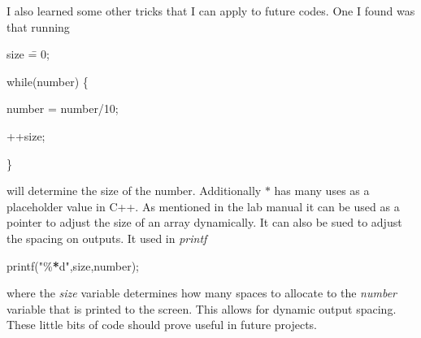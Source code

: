 \documentclass{article}
\begin{document}
I also learned some other tricks that I can apply to future codes. One I found was that running
\newline

size \= = 0;

while(number) \{

\tab number = number/10;

\tab ++size;

\}
\newline

will determine the size of the number. Additionally $\ast$ has many uses as a placeholder value in C++. As mentioned in the lab manual it can be used as a pointer to adjust the size of an array dynamically. It can also be sued to adjust the spacing on outputs. It used in \textit{printf}
\newline

printf("\%\textbf{*}d",size,number);
\newline

where the \textit{size} variable determines how many spaces to allocate to the \textit{number} variable that is printed to the screen. This allows for dynamic output spacing. These little bits of code should prove useful in future projects.
\end{document}
